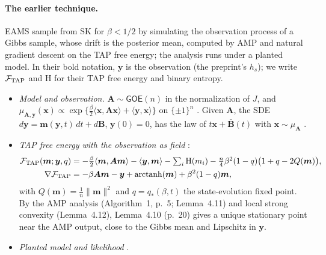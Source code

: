 \documentclass[11pt]{article}
\newcommand{\norm}[1]{\lVert #1\rVert}
\newcommand{\ip}[2]{\langle #1,#2\rangle}
\newcommand{\sloc}[2]{\cite[#2]{#1}}
\begin{document}
\paragraph{The earlier technique.}
EAMS sample from SK for $\beta<1/2$ by simulating the observation process of a
Gibbs sample, whose drift is the posterior mean, computed by AMP and natural
gradient descent on the TAP free energy; the analysis runs under a planted
model. In their bold notation, $\boldsymbol y$ is the observation (the
preprint's $h_s$); we write $\mathcal F_{\rm TAP}$ and $\mathrm H$ for their
TAP free energy and binary entropy.
\begin{itemize}
\item \emph{Model and observation.} $\boldsymbol A\sim\mathsf{GOE}(n)$ in the
normalization of $J$, and
$\mu_{\boldsymbol A,\boldsymbol y}(\boldsymbol x)\propto
\exp\{\frac\beta2\ip{\boldsymbol x}{\boldsymbol A\boldsymbol x}+\ip{\boldsymbol y}{\boldsymbol x}\}$
on $\{\pm1\}^n$ \sloc{ElAlaouiMontanariSellke2022-SamplingSKAlgorithmicSL}{(1.1), (2.1)}.
Given $\boldsymbol A$, the SDE
$d\boldsymbol y=\boldsymbol m(\boldsymbol y,t)\,dt+d\boldsymbol B$,
$\boldsymbol y(0)=0$, has the law of $t\boldsymbol x+\bar{\boldsymbol B}(t)$ with
$\boldsymbol x\sim\mu_{\boldsymbol A}$
\sloc{ElAlaouiMontanariSellke2022-SamplingSKAlgorithmicSL}{(1.4), p.~3; (4.12), pp.~11--12}.
\item \emph{TAP free energy with the observation as field}
\sloc{ElAlaouiMontanariSellke2022-SamplingSKAlgorithmicSL}{(2.3), p.~5; (4.53), p.~20}:
\begin{align*}
 \mathcal F_{\rm TAP}(\boldsymbol m;\boldsymbol y,q)&=-\tfrac\beta2\ip{\boldsymbol m}{\boldsymbol A\boldsymbol m}
 -\ip{\boldsymbol y}{\boldsymbol m}-\textstyle\sum_{i}\mathrm H(m_i)
 -\tfrac n4\beta^2(1-q)\bigl(1+q-2Q(\boldsymbol m)\bigr),\\
 \nabla\mathcal F_{\rm TAP}&=-\beta\boldsymbol A\boldsymbol m-\boldsymbol y
 +\operatorname{arctanh}(\boldsymbol m)+\beta^2(1-q)\boldsymbol m,
\end{align*}
with $Q(\boldsymbol m)=\frac1n\norm{\boldsymbol m}^2$ and $q=q_*(\beta,t)$ the
state-evolution fixed point. By the AMP analysis (Algorithm~1, p.~5;
Lemma~4.11) and local strong convexity (Lemma~4.12), Lemma~4.10 (p.~20) gives
a unique stationary point near the AMP output, close to the Gibbs mean and
Lipschitz in $\boldsymbol y$.
\item \emph{Planted model and likelihood}
\sloc{ElAlaouiMontanariSellke2022-SamplingSKAlgorithmicSL}{\S4.1, (4.1)--(4.9), pp.~10--11; Proposition~4.2; (4.14), p.~12}.

\end{itemize}
\end{document}
